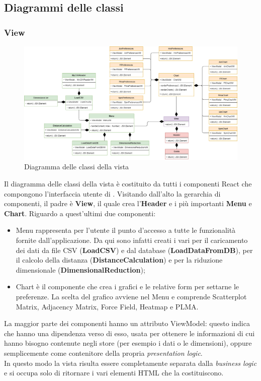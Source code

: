 \subsection{Diagrammi delle classi}
\subsubsection{View}
\begin{figure}[hb]
\includegraphics[width=\linewidth]{Images/Allegato Tecnico-Class View}
\centering
\caption{Diagramma delle classi della vista}
\end{figure}
Il diagramma delle classi della vista è costituito da tutti i componenti React che compongono l'interfaccia utente di \NomeProgetto{}.
Visitando dall'alto la gerarchia di componenti, il padre è \textbf{View}, il quale crea l'\textbf{Header} e i più importanti \textbf{Menu} e \textbf{Chart}. Riguardo a quest'ultimi due componenti:
\begin{itemize}
	\item Menu rappresenta per l'utente il punto d'accesso a tutte le funzionalità fornite dall'applicazione. Da qui sono infatti creati i vari  per il caricamento dei dati da file CSV (\textbf{LoadCSV}) e dal database (\textbf{LoadDataFromDB}), per il calcolo della distanza (\textbf{DistanceCalculation}) e per la riduzione dimensionale (\textbf{DimensionalReduction});
	\item Chart è il componente che crea i grafici e le relative form per settarne le preferenze. La scelta del grafico avviene nel Menu e comprende Scatterplot Matrix, Adjacency Matrix, Force Field, Heatmap e PLMA. 
\end{itemize}
La maggior parte dei componenti hanno un attributo ViewModel: questo indica che hanno una dipendenza verso di esso, usata per ottenere le informazioni di cui hanno bisogno contenute negli store (per esempio i dati o le dimensioni), oppure semplicemente come contenitore della propria \textit{presentation logic}. \\
In questo modo la vista risulta essere completamente separata dalla \textit{business logic} e si occupa solo di ritornare i vari elementi HTML che la costituiscono. 

